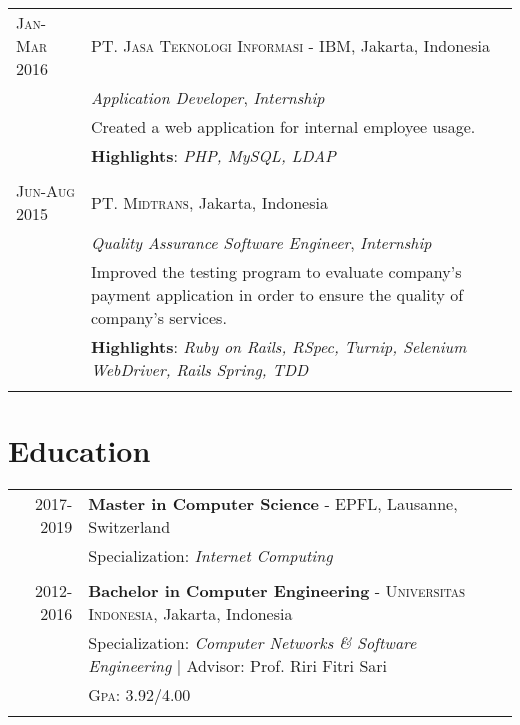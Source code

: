 \documentclass[a4paper,10pt]{article} %
\begin{document}
\begin{tabular}{lp{12cm}}
\textsc{Jan-Mar 2016} & \textsc{PT. Jasa Teknologi Informasi - IBM}, Jakarta, Indonesia \\
& \emph{Application Developer}, \textit{Internship}\\ 
& \footnotesize{Created a web application for internal employee usage.}\\
& \footnotesize{\textbf{Highlights}: \textit{PHP, MySQL, LDAP}}\\
\multicolumn{2}{c}{} \\


\textsc{Jun-Aug 2015} & \textsc{PT. Midtrans}, Jakarta, Indonesia \\
& \emph{Quality Assurance Software Engineer}, \textit{Internship}\\ 
& \footnotesize{Improved the testing program to evaluate company's payment application in order to ensure the quality of company's services.}\\
& \footnotesize{\textbf{Highlights}: \textit{Ruby on Rails, RSpec, Turnip, Selenium WebDriver, Rails Spring, TDD}}\\
\multicolumn{2}{c}{} \\
\end{tabular}

\vspace{-5mm}
\section{Education}

\begin{tabular}{rl}	
2017-2019 & \textbf{Master in Computer Science} - \textsc{EPFL}, Lausanne, Switzerland\\
& Specialization: \textit{Internet Computing} \\
&\\


2012-2016 & \textbf{Bachelor in Computer Engineering} - \normalsize\textsc{Universitas Indonesia}, Jakarta, Indonesia\\
& Specialization: \textit{Computer Networks \& Software Engineering} | \small Advisor: Prof. Riri Fitri Sari\\
&\normalsize \textsc{Gpa}: 3.92/4.00 \\
&\\

\end{tabular}
\end{document}
